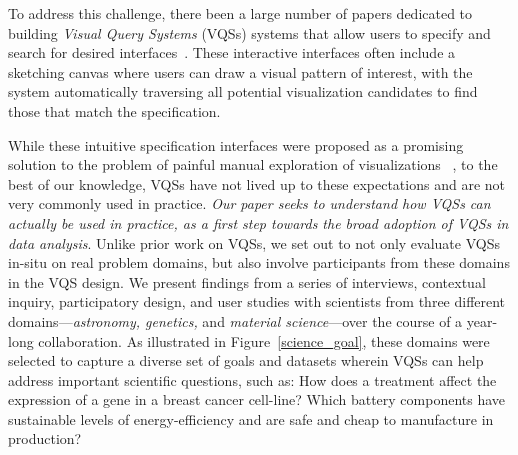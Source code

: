  To address this challenge, there  been a large number of papers dedicated to building \emph{Visual Query Systems} (VQSs) systems that allow users to specify and search for desired  interfaces~\cite{mohebbi2011google,Hochheiser2004,wattenberg2001sketching,Siddiqui2017VLDB,ryall2005querylines,correll2016semantics,Mannino2018,Eichmann2015,Holz2009}. %
 These interactive interfaces often include a sketching canvas where users can draw a visual pattern of interest, with the system automatically traversing all potential visualization candidates to find those that match the specification. 
 \par While these intuitive specification interfaces were proposed as a promising solution to the problem of painful manual exploration of visualizations ~\cite{ryall2005querylines,wattenberg2001sketching}, to the best of our knowledge, VQSs have not lived up to these expectations and are not very commonly used in practice.
 {\em Our paper seeks to understand how VQSs can actually be used in practice,
 as a first step towards the broad adoption of VQSs in data analysis}.
 Unlike prior work on VQSs,
 we set out to not only evaluate VQSs in-situ on
 real problem domains, but also involve participants
 from these domains in the VQS design. We present findings from a series of interviews, contextual inquiry, participatory design, and user studies with scientists from three different domains---{\em astronomy, genetics,} and {\em material science}---over the course of
 a year-long collaboration.  As illustrated in Figure~\ref{science_goal}, these domains were selected to capture a diverse set of goals and datasets wherein VQSs can help address important scientific questions, such as: How does a treatment affect the expression of a gene in a breast cancer cell-line? Which battery components have sustainable levels of energy-efficiency and are safe and
 cheap to manufacture in production?
